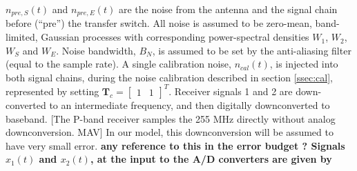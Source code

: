 \documentclass[draftcls,onecolumn]{IEEEtran}  %
\begin{document}
$n_{pre,S}(t)$ and $n_{pre,E}(t)$ are the noise from the antenna and the signal chain before (``pre'') the transfer switch. 
All noise is assumed to be zero-mean, band-limited, Gaussian processes with corresponding power-spectral densities $W_1$, $W_2$, $W_S$ and $W_E$.
Noise bandwidth, $B_N$, is assumed to be set by the anti-aliasing filter (equal to the sample rate). 
A single calibration noise, $n_{cal}(t)$, is injected into both signal chains, during the noise calibration described in section \ref{ssec:cal}, represented by setting 
$\mathbf{T}_c = [\begin{array}{cc} 1 & 1 \end{array} ]^T$. 
Receiver signals 1 and 2 are down-converted to an intermediate frequency, and then digitally downconverted to baseband. [The P-band receiver samples the 255 MHz directly without analog downconversion. MAV]
In our model, this downconversion will be assumed to have very small error.  \bf any reference to this in the error budget ? \rm
Signals $x_1(t)$ and $x_2(t)$, at the input to the A/D converters are given by
\end{document}
